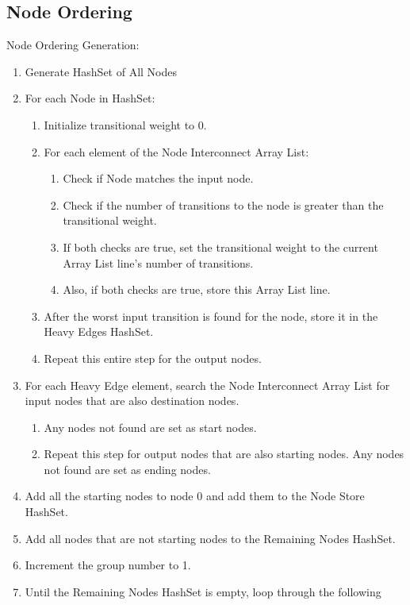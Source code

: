 \subsection{Node Ordering}
Node Ordering Generation:
 \begin{enumerate}
   \item Generate HashSet of All Nodes
   \item For each Node in HashSet:
   \begin{enumerate}
     \item Initialize transitional weight to 0.
     \item For each element of the Node Interconnect Array List:
     \begin{enumerate}
       \item Check if Node matches the input node.
       \item Check if the number of transitions to the node is greater than the
       transitional weight.
       \item If both checks are true, set the transitional weight to the current
       Array List line's number of transitions.
       \item Also, if both checks are true, store this Array List line.
     \end{enumerate}
     \item After the worst input transition is found for the node, store it in
     the Heavy Edges HashSet.
     \item Repeat this entire step for the output nodes.
   \end{enumerate}
   \item For each Heavy Edge element, search the Node Interconnect Array List
   for input nodes that are also destination nodes.
   \begin{enumerate}
     \item Any nodes not found are set as start nodes.
     \item Repeat this step for output nodes that are also starting nodes.  Any
     nodes not found are set as ending nodes.
   \end{enumerate}
   \item Add all the starting nodes to node 0 and add them to the Node Store
   HashSet.
   \item Add all nodes that are not starting nodes to the Remaining Nodes
   HashSet.
   \item Increment the group number to 1.
   \item Until the Remaining Nodes HashSet is empty, loop through the following

\end{enumerate}
